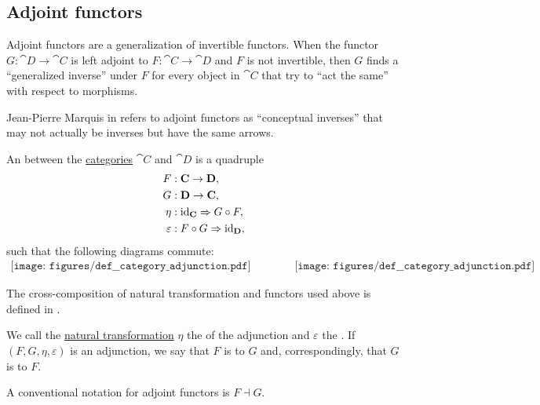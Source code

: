 \subsection{Adjoint functors}\label{subsec:adjoint_functors}

Adjoint functors are a generalization of invertible functors. When the functor \( G: \cat{D} \to \cat{C} \) is left adjoint to \( F: \cat{C} \to \cat{D} \) and \( F \) is not invertible, then \( G \) finds a \enquote{generalized inverse} under \( F \) for every object in \( \cat{C} \) that try to \enquote{act the same} with respect to morphisms.

Jean-Pierre Marquis in \cite{StanfordPlato:category_theory} refers to adjoint functors as \enquote{conceptual inverses} that may not actually be inverses but have the same arrows.

\begin{definition}\label{def:category_adjunction}
  An  between the \hyperref[def:category]{categories} \( \cat{C} \) and \( \cat{D} \) is a quadruple
  \begin{align*}
              F &: \cat{C} \to \cat{D}, \\
              G &: \cat{D} \to \cat{C}, \\
           \eta &: \id_{\cat{C}} \Rightarrow G \bincirc F, \\
    \varepsilon &: F \bincirc G \Rightarrow \id_{\cat{D}},
  \end{align*}
  such that the following diagrams commute:
  \begin{equation}\label{eq:def:category_adjunction/diagrams}
    \begin{aligned}
      \texttt{[image: figures/def\_\_category\_adjunction.pdf]}
      \quad\quad\quad\quad
      \texttt{[image: figures/def\_\_category\_adjunction.pdf]}
    \end{aligned}
  \end{equation}

  The cross-composition of natural transformation and functors used above is defined in .

  We call the \hyperref[def:natural_transformation]{natural transformation} \( \eta \) the  of the adjunction and \( \varepsilon \) the . If \( (F, G, \eta, \varepsilon) \) is an adjunction, we say that \( F \) is  to \( G \) and, correspondingly, that \( G \) is  to \( F \).

  A conventional notation for adjoint functors is \( F \dashv G \).
\end{definition}

